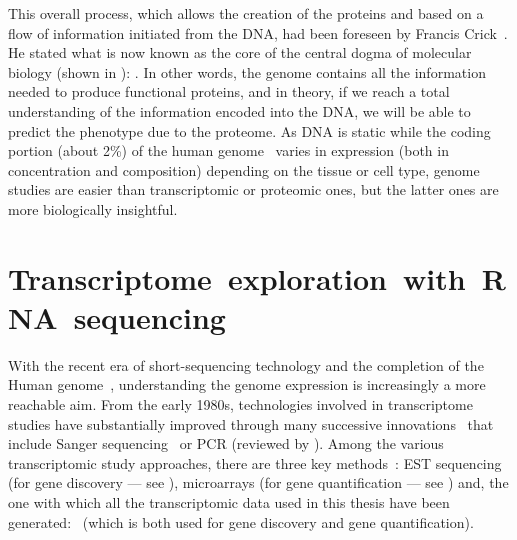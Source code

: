 This overall process, which allows the creation of the proteins and
based on a flow of information initiated from the \gls{DNA},
had been foreseen by Francis Crick~.
He stated what is now known as the core of the central dogma of molecular biology
(shown in ):
.
In other words, the genome contains all the information needed to produce
functional proteins,
and in theory, if we reach a total understanding of the information encoded
into the \gls{DNA},
we will be able to predict the \gls{phenotype} due to the proteome.
As \gls{DNA} is static
while the coding portion (about 2\%) of the human genome~
varies in expression (both in concentration and composition)
depending on the tissue or cell type,
genome studies are easier than transcriptomic or proteomic ones,
but the latter ones are more biologically insightful.\mybr\
\begin{comment}
There are different types of proteins: ubiquitous ones
(generally qualified as \emph{housekeeping}),
cell/tissue/condition specific ones and
everything in-between.
\end{comment}

\section[Transcriptome exploration with RNA sequencing]%
{Transcriptome~exploration~with~RNA~sequencing}\label{sec:transExplo}

With the recent era of short-sequencing technology and the completion of the
Human genome~,
understanding the genome expression is increasingly a more
reachable aim.
From the early 1980s,
technologies involved in transcriptome studies
have substantially improved through many successive innovations~
that include Sanger sequencing~\mycite{Sanger1975-io} or
\gls{PCR} (reviewed by \citet{VanGuilder2008-xs}).
Among the various transcriptomic study approaches,
there are three key methods~:
\gls{EST} sequencing (for gene discovery --- see ),
microarrays (for gene quantification --- see \Cref{sec:microarray})
and, the one with which all the transcriptomic data used in this thesis have
been generated:
\Rnaseq\ (which is both used for gene discovery and gene quantification).\mybr\

